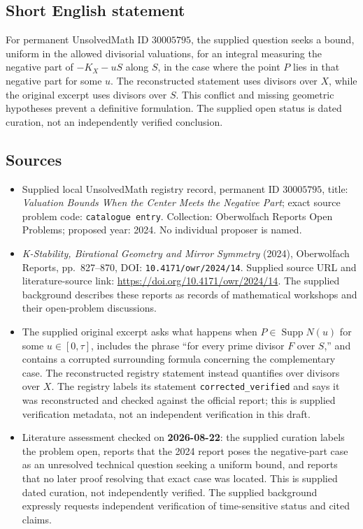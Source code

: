 \documentclass[11pt]{article}
\begin{document}
\subsection{Short English statement}
For permanent UnsolvedMath ID \(30005795\), the supplied question seeks a bound, uniform in the allowed divisorial valuations, for an integral measuring the negative part of \(-K_X-uS\) along \(S\), in the case where the point \(P\) lies in that negative part for some \(u\). The reconstructed statement uses divisors over \(X\), while the original excerpt uses divisors over \(S\). This conflict and missing geometric hypotheses prevent a definitive formulation. The supplied open status is dated curation, not an independently verified conclusion.
\subsection{Sources}
\begin{itemize}
\item Supplied local UnsolvedMath registry record, permanent ID \(30005795\), title: \emph{Valuation Bounds When the Center Meets the Negative Part}; exact source problem code: \texttt{catalogue entry}. Collection: Oberwolfach Reports Open Problems; proposed year: 2024. No individual proposer is named.
\item \emph{K-Stability, Birational Geometry and Mirror Symmetry} (2024), Oberwolfach Reports, pp.~827--870, DOI: \texttt{10.4171/owr/2024/14}. Supplied source URL and literature-source link: \url{https://doi.org/10.4171/owr/2024/14}. The supplied background describes these reports as records of mathematical workshops and their open-problem discussions.
\item The supplied original excerpt asks what happens when \(P\in\operatorname{Supp}N(u)\) for some \(u\in[0,\tau]\), includes the phrase ``for every prime divisor \(F\) over \(S\),'' and contains a corrupted surrounding formula concerning the complementary case. The reconstructed registry statement instead quantifies over divisors over \(X\). The registry labels its statement \texttt{corrected\_verified} and says it was reconstructed and checked against the official report; this is supplied verification metadata, not an independent verification in this draft.
\item Literature assessment checked on \textbf{2026-08-22}: the supplied curation labels the problem open, reports that the 2024 report poses the negative-part case as an unresolved technical question seeking a uniform bound, and reports that no later proof resolving that exact case was located. This is supplied dated curation, not independently verified. The supplied background expressly requests independent verification of time-sensitive status and cited claims.
\end{itemize}
\end{document}
